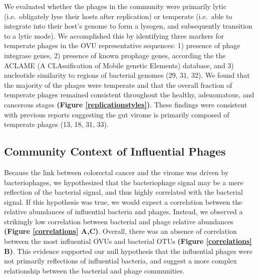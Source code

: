 \documentclass[12pt,]{article}
\begin{document}
We evaluated whether the phages in the community were primarily lytic
(i.e.~obligately lyse their hosts after replication) or temperate
(i.e.~able to integrate into their host's genome to form a lysogen, and
subsequently transition to a lytic mode). We accomplished this by
identifying three markers for temperate phages in the OVU representative
sequences: 1) presence of phage integrase genes, 2) presence of known
prophage genes, according the the ACLAME (A CLAssification of Mobile
genetic Elements) database, and 3) nucleotide similarity to regions of
bacterial genomes (29, 31, 32). We found that the majority of the phages
were temperate and that the overall fraction of temperate phages
remained consistent throughout the healthy, adenomatous, and cancerous
stages \textbf{(Figure \ref{replicationstyles})}. These findings were
consistent with previous reports suggesting the gut virome is primarily
composed of temperate phages (13, 18, 31, 33).

\subsection{Community Context of Influential
Phages}\label{community-context-of-influential-phages}

Because the link between colorectal cancer and the virome was driven by
bacteriophages, we hypothesized that the bacteriophage signal may be a
mere reflection of the bacterial signal, and thus highly correlated with
the bacterial signal. If this hypothesis was true, we would expect a
correlation between the relative abundances of influential bacteria and
phages. Instead, we observed a strikingly low correlation between
bacterial and phage relative abundances \textbf{(Figure
\ref{correlations} A,C)}. Overall, there was an absence of correlation
between the most influential OVUs and bacterial OTUs \textbf{(Figure
\ref{correlations} B)}. This evidence supported our null hypothesis that
the influential phages were not primarily reflections of influential
bacteria, and suggest a more complex relationship between the bacterial
and phage communities.
\end{document}
